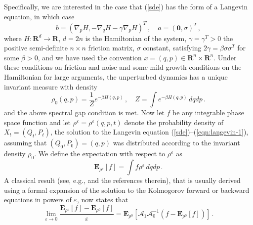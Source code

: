 \documentclass[aip,jcp,a4paper,reprint,onecolumn]{revtex4-1}
\newcommand{\R}{{\mathbf R}}
\newcommand{\eps}{\varepsilon}
\newcommand{\cA}{\mathcal A}
\newcommand{\bE}{{\mathbf E}}
\newcommand{\zero}{{\mathbf 0}}
\newcommand{\wrt}{with respect to }
\begin{document}
Specifically, we are interested in the case that (\ref{sde}) has the form of a Langevin equation, in which case  
\begin{equation}\label{eqn:langevin-1}
b = \left(\nabla_{p}H, -\nabla_{q} H - \gamma\nabla_{p}H\right )^{T}\,,\quad a= (\zero,\sigma)^{T}\,,
\end{equation}
where $H\colon\R^{d}\to\R$, $d=2n$ is the Hamiltonian of the system, $\gamma=\gamma^{T}>0$ the positive semi-definite $n\times n$ friction matrix, $\sigma$ constant, satisfying $2\gamma=\beta\sigma\sigma^{T}$ for some $\beta>0$, and we have used the convention $x=(q,p)\in\R^{n}\times\R^{n}$. Under these conditions on friction and noise and some mild growth conditions on the Hamiltonian for large arguments, the unperturbed dynamics has a unique invariant measure with density 
\[
\rho_{0}(q,p) = \frac{1}{Z}e^{-\beta H(q,p)}\,,\quad  Z=\int  e^{-\beta H(q,p)}\,dqdp\,.
\] 
and the above spectral gap condition is met. Now let $f$ be any integrable phase space function and let $\rho^{\eps}=\rho^{\eps}(q,p,t)$ denote the probability density of $X_t=(Q_{t},P_{t})$, the solution to the Langevin equation (\ref{sde})--(\ref{eqn:langevin-1}), assuming that $(Q_{0},P_{0})=(q,p)$ was distributed according to the invariant density $\rho_{0}$. We define the expectation \wrt $\rho^{\eps}$ as 
\[
\bE_{\rho^{\eps}}[f] = \int f \rho^{\eps} \,dqdp\,.
\] 
A classical result (see, e.g., \cite{HairerMaijda08} and the references therein), that is usually derived using a formal expansion of the solution to the Kolmogorov forward or backward equations in powers of $\eps$, now states that 
\begin{equation}\label{lr}
\lim_{\eps\to 0}\frac{\bE_{\rho^{\eps}}[f] - \bE_{\rho^{0}}[f]}{\eps} = \bE_{\rho^{0}}[\cA_{1}\cA_{0}^{-1}(f-\bE_{\rho^{0}}[f])]\,.
\end{equation}
\end{document}
